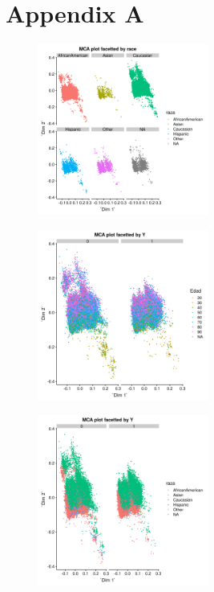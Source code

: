 \documentclass{article}\usepackage[]{graphicx}\usepackage[]{color}
\begin{document}
\newpage
\section{Appendix A}

\begin{figure}[!h]
\centering
\includegraphics[width=0.5\textwidth]{plots/etiqueta_mca_obs_race_facet}
\end{figure}

\begin{figure}[!h]
\centering
\includegraphics[width=0.5\textwidth]{plots/etiqueta_mca_obs_Y_facet_edad_col}
\end{figure}

\begin{figure}[!h]
\centering
\includegraphics[width=0.5\textwidth]{plots/etiqueta_mca_obs_Y_facet_raza_col}
\end{figure}
\end{document}
